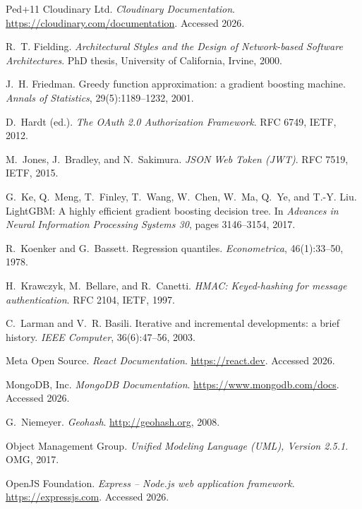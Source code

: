 \documentclass[12pt,letterpaper,twoside,openany]{report}
\begin{document}
\clearpage
{}
{}
\renewcommand{\bibname}{Bibliography}
\begin{thebibliography}{Ped+11}
 Cloudinary Ltd. \emph{Cloudinary Documentation}.
  \url{https://cloudinary.com/documentation}. Accessed 2026.

 R.~T. Fielding. \emph{Architectural Styles and the Design of Network-based
  Software Architectures}. PhD thesis, University of California, Irvine, 2000.

 J.~H. Friedman. Greedy function approximation: a gradient boosting machine.
  \emph{Annals of Statistics}, 29(5):1189--1232, 2001.

 D.~Hardt (ed.). \emph{The OAuth 2.0 Authorization Framework}. RFC 6749, IETF, 2012.

 M.~Jones, J.~Bradley, and N.~Sakimura. \emph{JSON Web Token (JWT)}. RFC 7519, IETF, 2015.

 G.~Ke, Q.~Meng, T.~Finley, T.~Wang, W.~Chen, W.~Ma, Q.~Ye, and T.-Y. Liu.
  LightGBM: A highly efficient gradient boosting decision tree. In \emph{Advances in Neural Information
  Processing Systems 30}, pages 3146--3154, 2017.

 R.~Koenker and G.~Bassett. Regression quantiles. \emph{Econometrica},
  46(1):33--50, 1978.

 H.~Krawczyk, M.~Bellare, and R.~Canetti. \emph{HMAC: Keyed-hashing for message
  authentication}. RFC 2104, IETF, 1997.

 C.~Larman and V.~R. Basili. Iterative and incremental developments: a brief history.
  \emph{IEEE Computer}, 36(6):47--56, 2003.

 Meta Open Source. \emph{React Documentation}. \url{https://react.dev}. Accessed 2026.

 MongoDB, Inc. \emph{MongoDB Documentation}. \url{https://www.mongodb.com/docs}.
  Accessed 2026.

 G.~Niemeyer. \emph{Geohash}. \url{http://geohash.org}, 2008.

 Object Management Group. \emph{Unified Modeling Language (UML), Version 2.5.1}. OMG, 2017.

 OpenJS Foundation. \emph{Express -- Node.js web application framework}.
  \url{https://expressjs.com}. Accessed 2026.


\end{thebibliography}
\end{document}
